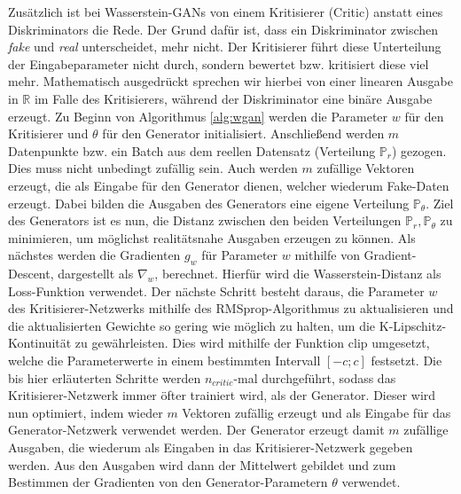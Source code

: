 Zusätzlich ist bei Wasserstein-GANs von einem Kritisierer (Critic) anstatt
eines Diskriminators die Rede. Der Grund dafür ist, dass ein Diskriminator
zwischen \textit{fake} und \textit{real} unterscheidet, mehr nicht. Der
Kritisierer führt diese Unterteilung der Eingabeparameter nicht durch, sondern
bewertet bzw. kritisiert diese viel mehr. Mathematisch ausgedrückt sprechen
wir hierbei von einer linearen Ausgabe in $\mathbb{R}$ im Falle des
Kritisierers, während der Diskriminator eine binäre Ausgabe erzeugt.  Zu
Beginn von Algorithmus \ref{alg:wgan} werden die Parameter $w$ für den
Kritisierer und $\theta$ für den Generator initialisiert. Anschließend werden
$m$ Datenpunkte bzw. ein Batch aus dem reellen Datensatz (Verteilung
$\mathbb{P}_r$) gezogen. Dies muss nicht unbedingt zufällig sein. Auch werden
$m$ zufällige Vektoren erzeugt, die als Eingabe für den Generator dienen,
welcher wiederum Fake-Daten erzeugt. Dabei bilden die Ausgaben des Generators
eine eigene Verteilung $\mathbb{P}_\theta$.  Ziel des Generators ist es nun,
die Distanz zwischen den beiden Verteilungen $\mathbb{P}_r, \mathbb{P}_\theta$
zu minimieren, um möglichst realitätsnahe Ausgaben erzeugen zu können. Als
nächstes werden die Gradienten $g_w$ für Parameter $w$ mithilfe von
Gradient-Descent, dargestellt als $\nabla_w$, berechnet. Hierfür wird die
Wasserstein-Distanz als Loss-Funktion verwendet.  Der nächste Schritt besteht
daraus, die Parameter $w$ des Kritisierer-Netzwerks mithilfe des
RMSprop-Algorithmus zu aktualisieren und die aktualisierten Gewichte so gering
wie möglich zu halten, um die K-Lipschitz-Kontinuität zu gewährleisten. Dies
wird mithilfe der Funktion $\mathrm{clip}$ umgesetzt, welche die
Parameterwerte in einem bestimmten Intervall $\left[-c; c\right]$ festsetzt.
Die bis hier erläuterten Schritte werden $n_{critic}$-mal durchgeführt, sodass
das Kritisierer-Netzwerk immer öfter trainiert wird, als der Generator. Dieser
wird nun optimiert, indem wieder $m$ Vektoren zufällig erzeugt und als Eingabe
für das Generator-Netzwerk verwendet werden. Der Generator erzeugt damit $m$
zufällige Ausgaben, die wiederum als Eingaben in das Kritisierer-Netzwerk
gegeben werden. Aus den Ausgaben wird dann der Mittelwert gebildet und zum
Bestimmen der Gradienten von den Generator-Parametern $\theta$ verwendet.

